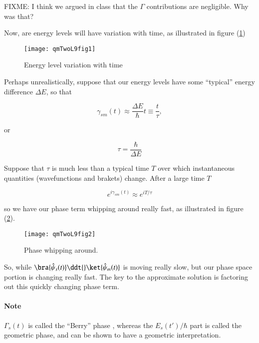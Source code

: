 FIXME: I think we argued in class that the $\Gamma$ contributions are negligible.  Why was that?

Now, are energy levels will have variation with time, as illustrated in figure (\ref{fig:qmTwoL9fig1})

\begin{figure}[htp]
\centering
\texttt{[image: qmTwoL9fig1]}
\caption{Energy level variation with time}\label{fig:qmTwoL9fig1}
\end{figure}

Perhaps unrealistically, suppose that our energy levels have some ``typical'' energy difference $\Delta E$, so that

\begin{equation}\label{eqn:qmTwoL9:230}
\gamma_{sm}(t) \approx \frac{\Delta E}{\hbar} t \equiv \frac{t}{\tau},
\end{equation}

or

\begin{equation}\label{eqn:qmTwoL9:250}
\tau = \frac{\hbar}{\Delta E}
\end{equation}

Suppose that $\tau$ is much less than a typical time $T$ over which instantaneous quantities (wavefunctions and brakets) change.  After a large time $T$

\begin{equation}\label{eqn:qmTwoL9:270}
e^{i \gamma_{sm}(t)} \approx e^{i T/\tau}
\end{equation}

so we have our phase term whipping around really fast, as illustrated in figure (\ref{fig:qmTwoL9fig2}).

\begin{figure}[htp]
\centering
\texttt{[image: qmTwoL9fig2]}
\caption{Phase whipping around.}\label{fig:qmTwoL9fig2}
\end{figure}

So, while $\bra{\hat{\psi}_s(t)} \ddt{} \ket{\hat{\psi}_m(t)}$ is moving really slow, but our phase space portion is changing really fast.  The key to the approximate solution is factoring out this quickly changing phase term.

\paragraph{Note} $\Gamma_s(t)$ is called the ``Berry'' phase \cite{wiki:GeometricPhase}, whereas the $E_s(t')/\hbar$ part is called the geometric phase, and can be shown to have a geometric interpretation.

